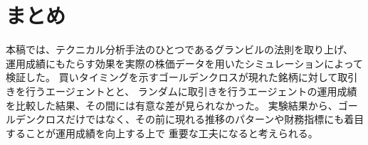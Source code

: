 \documentclass[twocolumn,jsaiac]{jarticle}
\begin{document}
\section{まとめ}
本稿では、テクニカル分析手法のひとつであるグランビルの法則を取り上げ、
運用成績にもたらす効果を実際の株価データを用いたシミュレーションによって検証した。
買いタイミングを示すゴールデンクロスが現れた銘柄に対して取引きを行うエージェントとと、
ランダムに取引きを行うエージェントの運用成績を比較した結果、その間には有意な差が見られなかった。
実験結果から、ゴールデンクロスだけではなく、その前に現れる推移のパターンや財務指標にも着目することが運用成績を向上する上で
重要な工夫になると考えられる。



\end{document}
